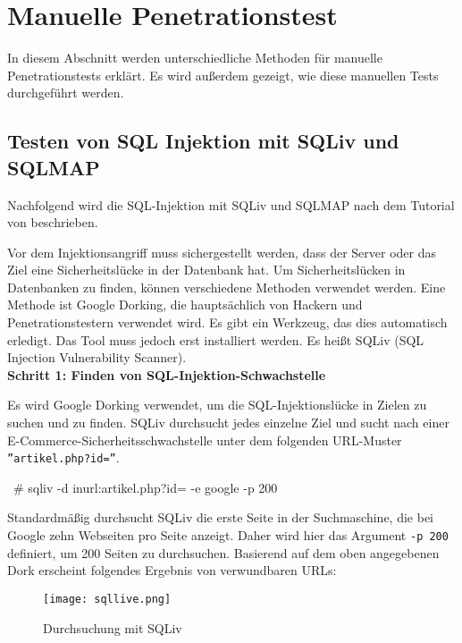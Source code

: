 \section{Manuelle Penetrationstest}

In diesem Abschnitt werden unterschiedliche Methoden für manuelle Penetrationstests erklärt. Es wird außerdem gezeigt, wie diese manuellen Tests durchgeführt werden.

\subsection{Testen von SQL Injektion mit SQLiv und SQLMAP}

Nachfolgend wird die SQL-Injektion mit SQLiv und SQLMAP nach dem Tutorial von \cite{ramadhan17sqlinj} beschrieben.

Vor dem Injektionsangriff muss sichergestellt werden, dass der Server oder das Ziel eine Sicherheitslücke in der Datenbank hat. Um Sicherheitslücken in Datenbanken zu finden, können verschiedene Methoden verwendet werden. Eine Methode ist Google Dorking, die hauptsächlich von Hackern und Penetrationstestern verwendet wird. Es gibt ein Werkzeug, das dies automatisch erledigt. Das Tool muss jedoch erst installiert werden. Es heißt SQLiv (SQL Injection Vulnerability Scanner).\\

\textbf{Schritt 1: Finden von SQL-Injektion-Schwachstelle}

Es wird Google Dorking verwendet, um die SQL-Injektionslücke in Zielen zu suchen und zu finden. SQLiv durchsucht jedes einzelne Ziel und sucht nach einer E-Commerce-Sicherheitsschwachstelle unter dem folgenden URL-Muster \texttt{''artikel.php?id=''}.\\

\begin{LaTeXCode}[caption={Google Dorking mit SQLiv \cite{ramadhan17sqlinj}},captionpos=b, label=LaTeXCode:gdsqliv][numbers=none]
~# sqliv -d inurl:artikel.php?id= -e google -p 200
\end{LaTeXCode}

Standardmäßig durchsucht SQLiv die erste Seite in der Suchmaschine, die bei Google zehn Webseiten pro Seite anzeigt. Daher wird hier das Argument \texttt{-p 200} definiert, um 200 Seiten zu durchsuchen. Basierend auf dem oben angegebenen Dork erscheint folgendes Ergebnis von verwundbaren URLs:

\begin{figure}[h]
	\centering
	\texttt{[image: sqllive.png]}
	\caption{Durchsuchung mit SQLiv}
\end{figure}

